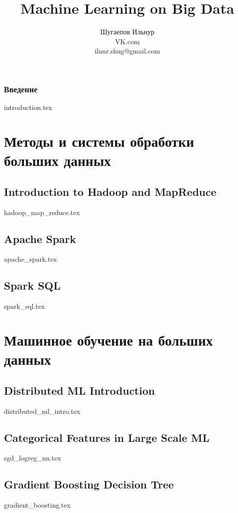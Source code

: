 \documentclass[openany,12pt]{book}
\title{Machine Learning on Big Data}
\author{Шугаепов Ильнур 
\\
\small{VK.com} 
\\
\small{ilnur.shug@gmail.com}}
\date{}
\numberwithin{equation}{section}
\begin{document}
\maketitle

\tableofcontents

\section*{Введение}
{introduction.tex}
 
\part{Методы и системы обработки больших данных}
\chapter{Introduction to Hadoop and MapReduce}
{hadoop_map_reduce.tex}

\chapter{Apache Spark}
{apache_spark.tex}

\chapter{Spark SQL}
{spark_sql.tex}

\part{Машинное обучение на больших данных}
\chapter{Distributed ML Introduction}
{distributed_ml_intro.tex}

\chapter{Categorical Features in Large Scale ML}
{sgd_logreg_nn.tex}

\chapter{Gradient Boosting Decision Tree}
{gradient_boosting.tex}
\end{document}

